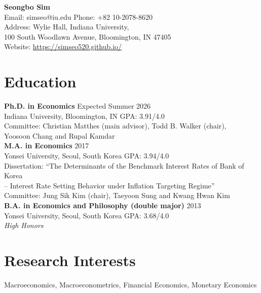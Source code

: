 \documentclass[11pt,a4paper]{article}
\begin{document}
\pagestyle{plain}


\onehalfspacing

\begin{center}
    {\LARGE \textbf{Seongbo Sim}} \\
    \vspace{2mm}
    Email: simseo@iu.edu \quad Phone: +82 10-2078-8620 \\
    Address: Wylie Hall, Indiana University, \\ 100 South Woodlawn Avenue, Bloomington, IN 47405 \\    
    Website: \url{https://simseo520.github.io/}
\end{center}

\vspace{5mm}

\section*{Education}
\textbf{Ph.D. in Economics} \hfill Expected Summer 2026 \\
Indiana University, Bloomington, IN \hfill GPA: 3.91/4.0 \\
Committee: Christian Matthes (main advisor), Todd B. Walker (chair), \\\phantom{Committee:}  Yoosoon Chang and Rupal Kamdar \\

\textbf{M.A. in Economics} \hfill 2017 \\
Yonsei University, Seoul, South Korea \hfill GPA: 3.94/4.0 \\
Dissertation: “The Determinants of the Benchmark Interest Rates of Bank of Korea\\
\phantom{Dissertation:} -- {\footnotesize Interest Rate Setting Behavior under Inflation Targeting Regime}” \\
Committee: Jung Sik Kim (chair), Taeyoon Sung and Kwang Hwan Kim\\

\textbf{B.A. in Economics and Philosophy (double major)} \hfill 2013 \\
Yonsei University, Seoul, South Korea \hfill GPA: 3.68/4.0\\
\emph{High Honors}\\

\section*{Research Interests}
Macroeconomics, Macroeconometrics, Financial Economics, Monetary Economics
\end{document}
